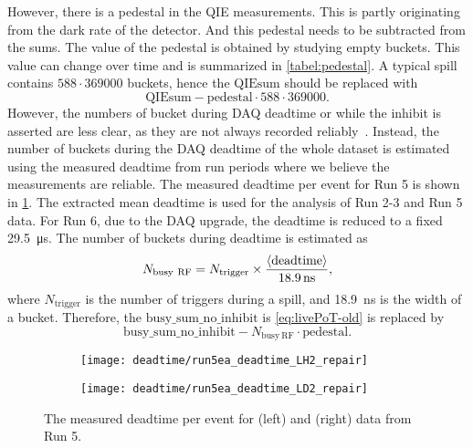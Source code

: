 \documentclass[../main.tex]{subfiles}
\begin{document}
However, there is a pedestal in the QIE measurements. This is partly originating from the dark rate of the
detector. And this pedestal needs to be subtracted from the sums.
The value of the pedestal is obtained by studying empty buckets.
This value can change over time and is summarized in \cref{tabel:pedestal}.
A typical spill contains $588\cdot 369000$ buckets, hence the $\mathrm{QIEsum}$ should be replaced with
\begin{equation}
	\mathrm{QIEsum}-\mathrm{pedestal}\cdot 588\cdot 369000.
\end{equation}
However, the numbers of bucket during DAQ deadtime or while the inhibit is asserted are less clear,
as they are not always recorded reliably~\cite{chleung-10662}.
Instead, the number of buckets during the DAQ deadtime of the whole dataset
is estimated using the measured deadtime from run periods where we believe the measurements are reliable.
The measured deadtime per event for Run 5 is shown in \cref{fig:deadtime}.
The extracted mean deadtime is used for the analysis of Run 2-3 and Run 5 data.
For Run 6, due to the DAQ upgrade, the deadtime is reduced to a fixed \SI{29.5}{\us}.
The number of buckets during deadtime is estimated as
\begin{equation}
	N_{\mathrm{busy\ RF}}=N_{\mathrm{trigger}}\times\frac{\expval{\mathrm{deadtime}}}{\SI{18.9}{\ns}},
\end{equation}
where $N_{\mathrm{trigger}}$ is the number of triggers during a spill, and \SI{18.9}{\ns} is the width of a bucket.
Therefore, the $\mathrm{busy\_sum\_no\_inhibit}$ is \cref{eq:livePoT-old} is replaced by
\begin{equation}
	\mathrm{busy\_sum\_no\_inhibit} - N_{\mathrm{busy\ RF}}\cdot \mathrm{pedestal}.
\end{equation}
\begin{figure}[h!]
	\centering
	\begin{subfigure}{0.45\linewidth}
		\texttt{[image: deadtime/run5ea\_deadtime\_LH2\_repair]}
	\end{subfigure}
	\begin{subfigure}{0.45\linewidth}
		\texttt{[image: deadtime/run5ea\_deadtime\_LD2\_repair]}
	\end{subfigure}
	\caption{The measured deadtime per event for  (left) and  (right) data from Run 5.}
	\label{fig:deadtime}
\end{figure}
\end{document}

